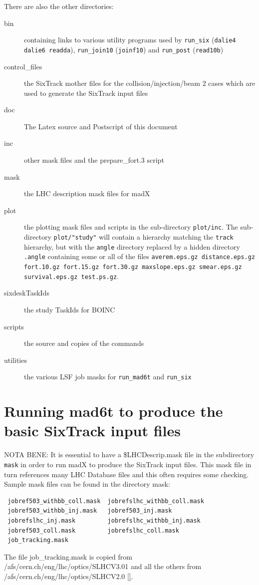 \documentclass{cernatsnote}    %
\begin{document}
There are also the other directories:
\begin{description}
\item [bin] containing links to various utility programs used by {\tt run\_six}
({\tt dalie4 dalie6 readda}), {\tt run\_join10} ({\tt joinf10})
and {\tt run\_post} ({\tt read10b})
\item [control\_files] the SixTrack mother files for the collision/injection/beam 2
cases which are used to generate the SixTrack input files
\item [doc] The Latex source and Postscript of this document
\item [inc] other mask files and the prepare\_fort.3 script
\item [mask] the LHC description mask files for madX 
\item [plot] the plotting mask files and scripts in the sub-directory {\tt plot/inc}.
The sub-directory {\tt plot/"study"} will contain a hierarchy matching the {\tt track}
hierarchy, but with the {\tt angle} directory replaced by a hidden directory {\tt .angle}  
containing some or all of the files {\tt averem.eps.gz distance.eps.gz fort.10.gz 
fort.15.gz fort.30.gz maxslope.eps.gz smear.eps.gz survival.eps.gz test.ps.gz}.
\item [sixdeskTaskIds] the study TaskIds for BOINC
\item [scripts] the source and copies of the commands
\item [utilities] the various LSF job masks for {\tt run\_mad6t} and {\tt run\_six}  
\end{description}
\section{Running mad6t to produce the basic SixTrack input files}
\label{sec:mad_6t}
NOTA BENE: It is essential to have a \$LHCDescrip.mask file
in the subdirectory {\tt mask} in order to run madX to produce
the SixTrack input files. This mask file in turn references many
LHC Database files and this often requires some checking.
Sample mask files can be found in the directory mask:
\begin{verbatim}
 jobref503_withbb_coll.mask  jobrefslhc_withbb_coll.mask  
 jobref503_withbb_inj.mask   jobref503_inj.mask        
 jobrefslhc_inj.mask         jobrefslhc_withbb_inj.mask
 jobref503_coll.mask         jobrefslhc_coll.mask        
 job_tracking.mask
\end{verbatim}
The file job\_tracking.mask is copied from
/afs/cern.ch/eng/lhc/optics/SLHCV3.01 and all the
others from /afs/cern.ch/eng/lhc/optics/SLHCV2.0 \ref{}.
\end{document}
